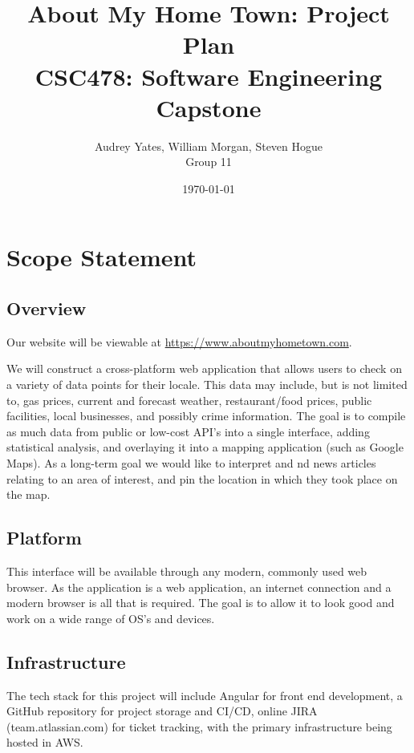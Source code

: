 \documentclass[12pt]{article}
\title{\bf About My Home Town: Project Plan \\ \large CSC478: Software Engineering Capstone}
\author{Audrey Yates, William Morgan, Steven Hogue \\ Group 11}
\date{\today}
\begin{document}
\maketitle

\tableofcontents

\newpage

\section{Scope Statement}\label{sec:scope}

\subsection{Overview}

Our website will be viewable at \href{https://www.aboutmyhometown.com}{https://www.aboutmyhometown.com}.

We will construct a cross-platform web application that allows users to check on a variety of data points for their locale. This data may include, but is not limited to, gas prices, current and forecast weather, restaurant/food prices, public facilities, local businesses, and possibly crime information. The goal is to compile as much data from public or low-cost API's into a single interface, adding statistical analysis, and overlaying it into a mapping application (such as Google Maps). As a long-term goal we would like to interpret and nd news articles relating to an area of interest, and pin the location in which they took place on the map.

\subsection{Platform}

This interface will be available through any modern, commonly used web browser. As the application is a web application, an internet connection and a modern browser is all that is required. The goal is to allow it to look good and work on a wide range of OS's and devices.

\subsection{Infrastructure}

The tech stack for this project will include Angular for front end development, a GitHub repository for project storage and CI/CD, online JIRA (team.atlassian.com) for ticket tracking, with the primary infrastructure being hosted in AWS.
\end{document}
